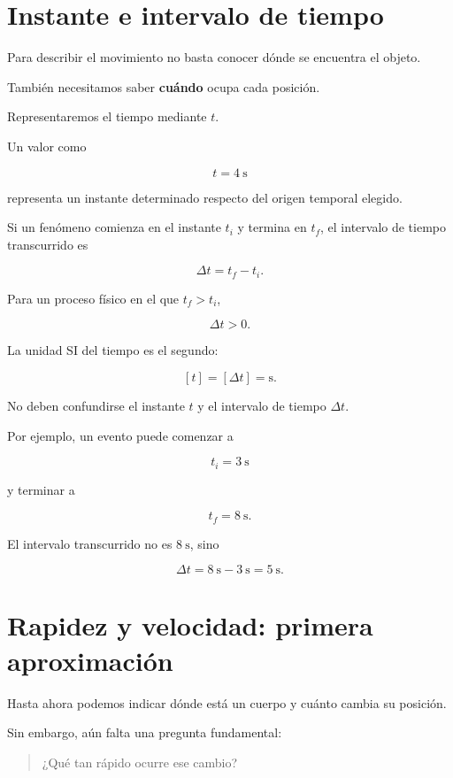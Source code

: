 \section{Instante e intervalo de tiempo}

Para describir el movimiento no basta conocer dónde se encuentra el objeto.

También necesitamos saber \textbf{cuándo} ocupa cada posición.

Representaremos el tiempo mediante \(t\).

Un valor como

\[ t=\SI{4}{\second} \]

representa un instante determinado respecto del origen temporal elegido.

Si un fenómeno comienza en el instante \(t_i\) y termina en \(t_f\), el
intervalo de tiempo transcurrido es

\[ \boxed{\Delta t=t_f-t_i}. \]

Para un proceso físico en el que \(t_f>t_i\),

\[ \Delta t>0. \]

La unidad SI del tiempo es el segundo:

\[ [t]=[\Delta t]=\si{\second}. \]

\begin{advertencia}
No deben confundirse el instante \(t\) y el intervalo de tiempo
\(\Delta t\).

Por ejemplo, un evento puede comenzar a

\[ t_i=\SI{3}{\second} \]

y terminar a

\[ t_f=\SI{8}{\second}. \]

El intervalo transcurrido no es \(\SI{8}{\second}\), sino

\[
\Delta t=\SI{8}{\second}-\SI{3}{\second}
=\SI{5}{\second}.
\]
\end{advertencia}


\section{Rapidez y velocidad: primera aproximación}

Hasta ahora podemos indicar dónde está un cuerpo y cuánto cambia su
posición.

Sin embargo, aún falta una pregunta fundamental:

\begin{quote}
¿Qué tan rápido ocurre ese cambio?
\end{quote}

